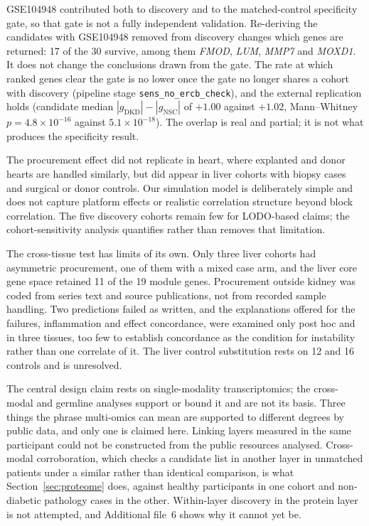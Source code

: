 \documentclass[pdflatex,sn-vancouver-num]{sn-jnl}
\theoremstyle{thmstyleone}
\theoremstyle{thmstyletwo}
\theoremstyle{thmstylethree}
\begin{document}
GSE104948 contributed both to discovery and to the matched-control specificity gate, so that gate is not a fully independent validation. Re-deriving the candidates with GSE104948 removed from discovery changes which genes are returned: 17 of the 30 survive, among them \textit{FMOD}, \textit{LUM}, \textit{MMP7} and \textit{MOXD1}. It does not change the conclusions drawn from the gate. The rate at which ranked genes clear the gate is no lower once the gate no longer shares a cohort with discovery (pipeline stage \texttt{sens\_no\_ercb\_check}), and the external replication holds (candidate median $|g_{\text{DKD}}| - |g_{\text{NSC}}|$ of $+1.00$ against $+1.02$, Mann--Whitney $p = 4.8 \times 10^{-16}$ against $5.1 \times 10^{-18}$). The overlap is real and partial; it is not what produces the specificity result.

The procurement effect did not replicate in heart, where explanted and donor hearts are handled similarly, but did appear in liver cohorts with biopsy cases and surgical or donor controls. Our simulation model is deliberately simple and does not capture
platform effects or realistic correlation structure beyond block correlation. The five discovery
cohorts remain few for LODO-based claims; the cohort-sensitivity analysis quantifies rather than
removes that limitation.

The cross-tissue test has limits of its own. Only three liver cohorts had asymmetric procurement,
one of them with a mixed case arm, and the liver core gene space retained 11 of the 19 module
genes. Procurement outside kidney was coded from series text and source publications, not from
recorded sample handling. Two predictions failed as written, and the explanations offered for
the failures, inflammation and effect concordance, were examined only post hoc and in three
tissues, too few to establish concordance as the condition for instability rather than one
correlate of it. The liver control substitution rests on 12 and 16 controls and is unresolved.

The central design claim rests on single-modality transcriptomics; the cross-modal and germline analyses support or bound it and are not its basis. Three things the phrase multi-omics can mean are supported to different degrees by public data, and only one is claimed here. Linking layers measured in the same participant could not be constructed from the public resources analysed. Cross-modal corroboration, which checks a candidate list in another layer in unmatched patients under a similar rather than identical comparison, is what Section~\ref{sec:proteome} does, against healthy participants in one cohort and non-diabetic pathology cases in the other. Within-layer discovery in the protein layer is not attempted, and Additional file~6 shows why it cannot yet be.
\end{document}
